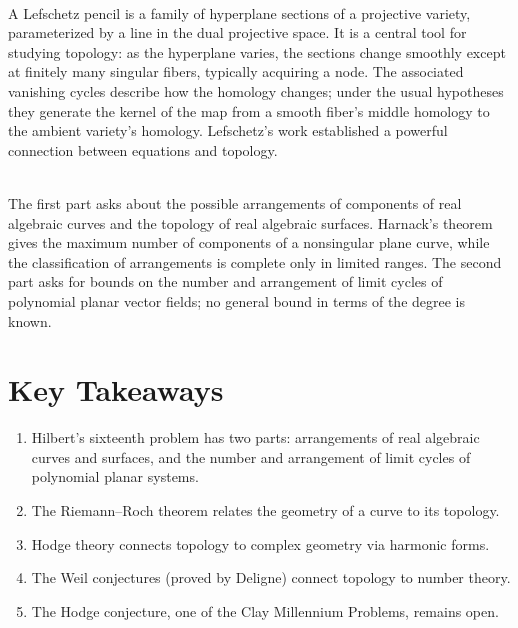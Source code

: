 \begin{description}[font=\bfseries, leftmargin=2em, style=nextline]
\item[Q: What is a Lefschetz pencil?]\hfill\\
A Lefschetz pencil is a family of hyperplane sections of a projective variety, parameterized by a line in the dual projective space. It is a central tool for studying topology: as the hyperplane varies, the sections change smoothly except at finitely many singular fibers, typically acquiring a node. The associated vanishing cycles describe how the homology changes; under the usual hypotheses they generate the kernel of the map from a smooth fiber's middle homology to the ambient variety's homology. Lefschetz's work established a powerful connection between equations and topology.

\item[Q: How does Hilbert's 16th problem split into two parts?]\hfill\\
The first part asks about the possible arrangements of components of real algebraic curves and the topology of real algebraic surfaces. Harnack's theorem gives the maximum number of components of a nonsingular plane curve, while the classification of arrangements is complete only in limited ranges. The second part asks for bounds on the number and arrangement of limit cycles of polynomial planar vector fields; no general bound in terms of the degree is known.

\end{description}

\section*{Key Takeaways}

\begin{enumerate}
    \item Hilbert's sixteenth problem has two parts: arrangements of real algebraic curves and surfaces, and the number and arrangement of limit cycles of polynomial planar systems.
    \item The Riemann--Roch theorem relates the geometry of a curve to its topology.
    \item Hodge theory connects topology to complex geometry via harmonic forms.
    \item The Weil conjectures (proved by Deligne) connect topology to number theory.
    \item The Hodge conjecture, one of the Clay Millennium Problems, remains open.
\end{enumerate}

